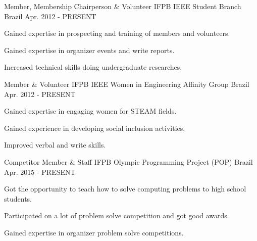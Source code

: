 

\begin{cventries}

  \cventry
    {Member, Membership Chairperson \& Volunteer} %
    {IFPB IEEE Student Branch} %
    {Brazil} %
    {Apr. 2012 - PRESENT} %
    {
      \begin{cvitems} %
        \item {Gained expertise in prospecting and training of members and volunteers.}
        \item {Gained expertise in organizer events and write reports.}
        \item {Increased technical skills doing undergraduate researches.}
      \end{cvitems}
    }
    
  \cventry
    {Member \& Volunteer} %
    {IFPB IEEE Women in Engineering Affinity Group} %
    {Brazil} %
    {Apr. 2012 - PRESENT} %
    {
      \begin{cvitems} %
        \item {Gained expertise in engaging women for STEAM fields.}
        \item {Gained experience in developing social inclusion activities.}
        \item {Improved verbal and write skills.}
      \end{cvitems}
    }

  \cventry
    {Competitor Member \& Staff} %
    {IFPB Olympic Programming Project (POP)} %
    {Brazil} %
    {Apr. 2015 - PRESENT} %
    {
      \begin{cvitems} %
        \item {Got the opportunity to teach how to solve computing problems to high school students.}
        \item {Participated on a lot of problem solve competition and got good awards.}
        \item {Gained expertise in organizer problem solve competitions.}
      \end{cvitems}
    }


\end{cventries}
